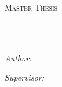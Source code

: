 \documentclass[
11pt, %
oneside, %
english, %
singlespacing, %
headsepline, %
]{MastersDoctoralThesis} %
\author{Tom Suad} %
\begin{document}
\frontmatter %

\pagestyle{plain} %


\begin{titlepage}
\begin{center}

\vspace*{.06\textheight}
{\scshape\LARGE \univname\par}\vspace{1.5cm} %
\textsc{\Large Master Thesis}\\[0.5cm] %

\HRule \\[0.4cm] %
{\huge \bfseries \ttitle\par}\vspace{0.4cm} %
\HRule \\[1.5cm] %
 
\begin{minipage}[t]{0.4\textwidth}
\begin{flushleft} \large
\emph{Author:}\\
\authorname
\end{flushleft}
\end{minipage}
\begin{minipage}[t]{0.4\textwidth}
\begin{flushright} \large
\emph{Supervisor:} \\
\supname %
\end{flushright}
\end{minipage}\\[3cm]
 
\vfill
\groupname\\\deptname\\[2cm] %
 

\end{center}
\end{titlepage}
\end{document}
